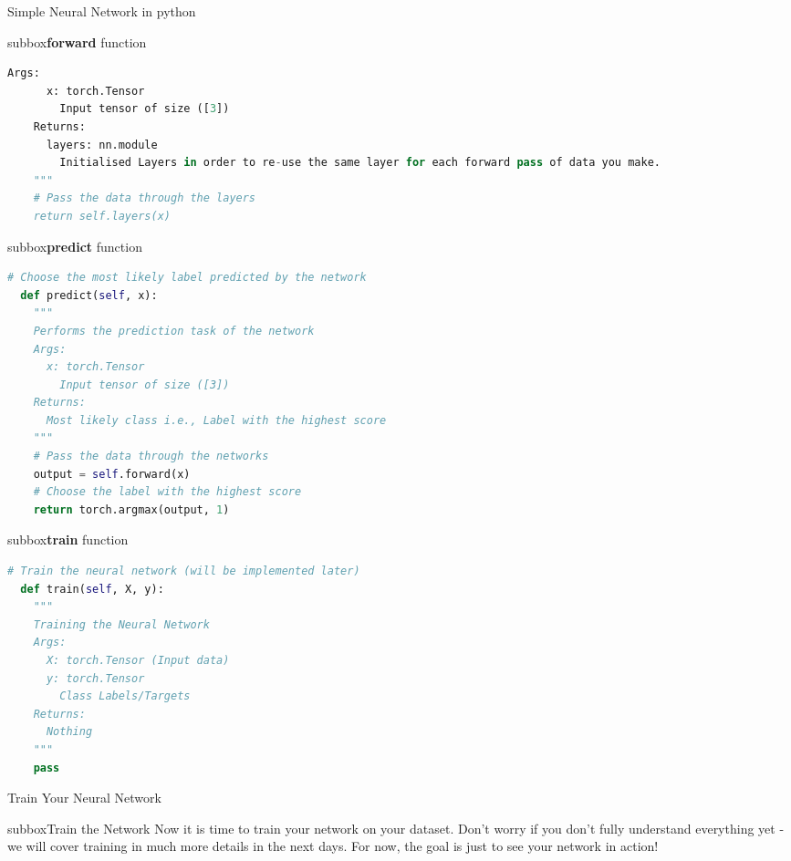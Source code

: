\begin{multicols}{3}
\begin{textbox}{Simple Neural Network in python}
\begin{subbox}{subbox}{\textbf{forward} function }
\begin{lstlisting}[language=Python]
    Args:
      x: torch.Tensor
        Input tensor of size ([3])
    Returns:
      layers: nn.module
        Initialised Layers in order to re-use the same layer for each forward pass of data you make.
    """
    # Pass the data through the layers
    return self.layers(x)
\end{lstlisting}
\end{subbox}
\begin{subbox}{subbox}{\textbf{predict} function }
\begin{lstlisting}[language=Python]
  # Choose the most likely label predicted by the network
  def predict(self, x):
    """
    Performs the prediction task of the network
    Args:
      x: torch.Tensor
        Input tensor of size ([3])
    Returns:
      Most likely class i.e., Label with the highest score
    """
    # Pass the data through the networks
    output = self.forward(x)
    # Choose the label with the highest score
    return torch.argmax(output, 1)
\end{lstlisting}
\end{subbox}

\begin{subbox}{subbox}{\textbf{train} function }
\tiny
\begin{lstlisting}[language=Python]
  # Train the neural network (will be implemented later)
  def train(self, X, y):
    """
    Training the Neural Network
    Args:
      X: torch.Tensor (Input data)
      y: torch.Tensor
        Class Labels/Targets
    Returns:
      Nothing
    """
    pass
\end{lstlisting}
\end{subbox}

\end{textbox}
\begin{textbox}{Train Your Neural Network}
\begin{subbox}{subbox}{Train the Network}
\scriptsize
Now it is time to train your network on your dataset. Don’t worry if you don’t fully understand everything yet - we will cover training in much more details in the next days. For now, the goal is just to see your network in action!


\end{subbox}
\end{textbox}
\end{multicols}

